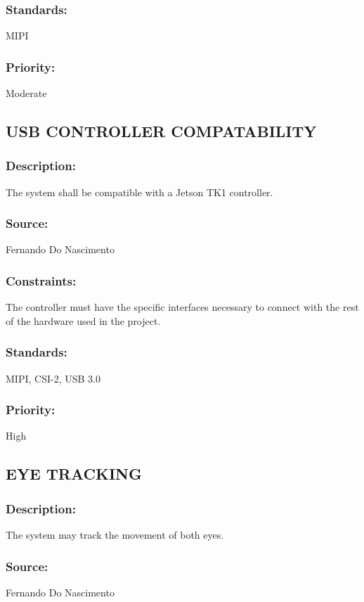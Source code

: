 \subsubsection{Standards:} 
	{MIPI}
\subsubsection{Priority:} 
	{Moderate}
\newline
	
\subsection{\text USB CONTROLLER COMPATABILITY}
\subsubsection{Description:} 
	{The system shall be compatible with a Jetson TK1 controller.}
\subsubsection{Source:} 
	{Fernando Do Nascimento}
\subsubsection{Constraints:} 
	{The controller must have the specific interfaces necessary to connect with the rest of the hardware used in the project.}
\subsubsection{Standards:} 
	{MIPI, CSI-2, USB 3.0}
\subsubsection{Priority:} 
	{High}
\newline
	
\subsection{\text EYE TRACKING}
\subsubsection{Description:} 
	{The system may track the movement of both eyes.}
\subsubsection{Source:} 
	{Fernando Do Nascimento}
